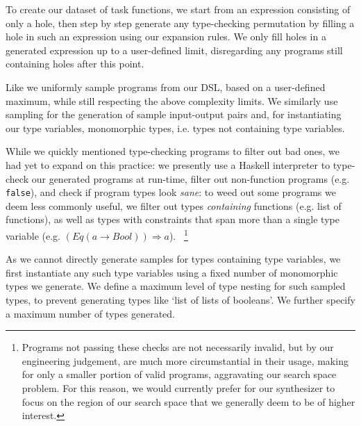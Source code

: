 \documentclass{article} %
\begin{document}

To create our dataset of task functions,
we start from an expression consisting of only a hole,
then step by step generate any type-checking permutation
by filling a hole in such an expression using our expansion rules.
We only fill holes in a generated expression up to a 
user-defined limit,
disregarding any programs still containing holes after this point.

Like \citet{nsps} we uniformly sample programs from our DSL,
based on a 
user-defined maximum,
while still respecting the above complexity limits.
We similarly use sampling for the generation of sample input-output pairs and,
for instantiating our type variables, monomorphic types,
i.e. types not containing type variables.

While we quickly mentioned type-checking programs to filter out bad ones,
we had yet to expand on this practice:
we presently use a Haskell interpreter to type-check our generated programs at run-time,
filter out non-function programs (e.g. \verb|false|),
and check if program types look \emph{sane}:
to weed out some programs we deem less commonly useful,
we filter out types \emph{containing} functions (e.g. list of functions),
as well as types with constraints that span more than a single type variable (e.g. $(Eq (a \rightarrow Bool)) \Rightarrow a$).%
~\footnote{
    Programs not passing these checks are not necessarily invalid,
    but by our engineering judgement,
    are much more circumstantial in their usage,
    making for only a smaller portion of valid programs,
    aggravating our search space problem.
    For this reason, we would currently prefer for our synthesizer to focus on
    the region of our search space that we generally deem to be of higher interest.
}

As we cannot directly generate samples for types containing type variables,
we first instantiate any such type variables using a fixed number of monomorphic types we generate.
We define a
maximum level of type nesting for such sampled types,
to prevent generating types like `list of lists of booleans'.
We further specify a maximum number of types generated.
\end{document}
